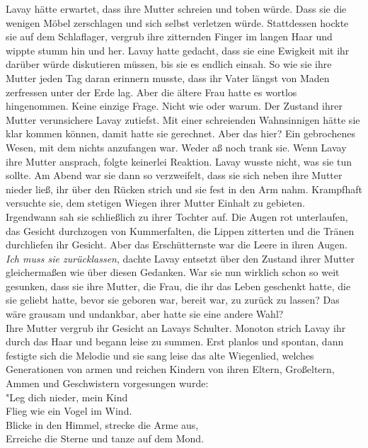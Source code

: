 Lavay hätte erwartet, dass ihre Mutter schreien und toben würde. Dass sie die wenigen Möbel 
zerschlagen und sich selbst verletzen würde. Stattdessen hockte sie auf dem Schlaflager, vergrub 
ihre zitternden Finger im langen Haar und wippte stumm hin und her. Lavay hatte gedacht, dass sie 
eine Ewigkeit mit ihr darüber würde diskutieren müssen, bis sie es endlich einsah. So wie sie 
ihre Mutter jeden Tag daran erinnern musste, dass ihr Vater längst von Maden zerfressen unter der 
Erde lag. Aber die ältere Frau hatte es wortlos hingenommen. Keine einzige Frage. Nicht wie oder 
warum. Der Zustand ihrer Mutter verunsichere Lavay zutiefst. Mit einer schreienden Wahnsinnigen 
hätte sie klar kommen können, damit hatte sie gerechnet. Aber das hier? Ein gebrochenes Wesen, mit 
dem nichts anzufangen war. Weder aß noch trank sie. Wenn Lavay ihre Mutter ansprach, folgte 
keinerlei Reaktion. Lavay wusste nicht, was sie tun sollte. Am Abend war sie dann so verzweifelt, 
dass sie sich neben ihre Mutter nieder ließ, ihr über den Rücken strich und sie fest in den Arm 
nahm. Krampfhaft versuchte sie, dem stetigen Wiegen ihrer Mutter Einhalt zu gebieten. \\
Irgendwann sah sie schließlich zu ihrer Tochter auf. Die Augen rot unterlaufen, das Gesicht 
durchzogen von Kummerfalten, die Lippen zitterten und die Tränen durchliefen ihr Gesicht. Aber das 
Erschütternste war die Leere in ihren Augen. \\
\textit{Ich muss sie zurücklassen}, dachte Lavay entsetzt über den Zustand ihrer Mutter 
gleichermaßen wie über diesen Gedanken. War sie nun wirklich schon so weit gesunken, dass sie ihre 
Mutter, die Frau, die ihr das Leben geschenkt hatte, die sie geliebt hatte, bevor sie 
geboren war, bereit war, zu zurück zu lassen? Das wäre grausam und undankbar, aber hatte sie eine 
andere Wahl? \\
Ihre Mutter vergrub ihr Gesicht an Lavays Schulter. Monoton strich Lavay ihr durch 
das Haar und begann leise zu summen. Erst planlos und spontan, dann festigte sich die Melodie und 
sie sang leise das alte Wiegenlied, welches Generationen von armen und reichen Kindern von ihren 
Eltern, Großeltern, Ammen und Geschwistern vorgesungen wurde:\\
"Leg dich nieder, mein Kind\\
Flieg wie ein Vogel im Wind.\\
Blicke in den Himmel, strecke die Arme aus,\\
Erreiche die Sterne und tanze auf dem Mond.\\
